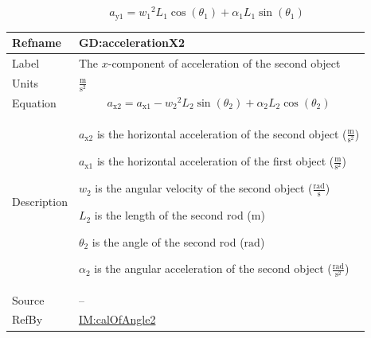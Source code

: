\documentclass[12pt]{article}
\begin{document}
\begin{displaymath}
{a_{\text{y}1}}={w_{1}}^{2} {L_{1}} \cos\left({θ_{1}}\right)+{α_{1}} {L_{1}} \sin\left({θ_{1}}\right)
\end{displaymath}
\vspace{\baselineskip}
\noindent
\begin{minipage}{\textwidth}
\begin{tabular}{>{\raggedright}p{}>{\raggedright\arraybackslash}p{}}
\toprule \textbf{Refname} & \textbf{GD:accelerationX2}
\label{GD:accelerationX2}
\\ \midrule
Label & The $x$-component of acceleration of the second object
        
\\ \midrule
Units & $\frac{\text{m}}{\text{s}^{2}}$
        
\\ \midrule
Equation & \begin{displaymath}
           {a_{\text{x}2}}={a_{\text{x}1}}-{w_{2}}^{2} {L_{2}} \sin\left({θ_{2}}\right)+{α_{2}} {L_{2}} \cos\left({θ_{2}}\right)
           \end{displaymath}
\\ \midrule
Description & \begin{symbDescription}
              \item{${a_{\text{x}2}}$ is the horizontal acceleration of the second object ($\frac{\text{m}}{\text{s}^{2}}$)}
              \item{${a_{\text{x}1}}$ is the horizontal acceleration of the first object ($\frac{\text{m}}{\text{s}^{2}}$)}
              \item{${w_{2}}$ is the angular velocity of the second object ($\frac{\text{rad}}{\text{s}}$)}
              \item{${L_{2}}$ is the length of the second rod (${\text{m}}$)}
              \item{${θ_{2}}$ is the angle of the second rod (${\text{rad}}$)}
              \item{${α_{2}}$ is the angular acceleration of the second object ($\frac{\text{rad}}{\text{s}^{2}}$)}
              \end{symbDescription}
\\ \midrule
Source & --
         
\\ \midrule
RefBy & \hyperref[IM:calOfAngle2]{IM:calOfAngle2}
        
\\ \bottomrule
\end{tabular}
\end{minipage}
\end{document}

